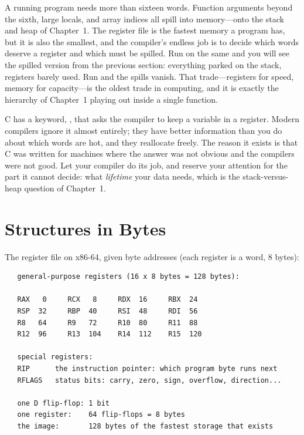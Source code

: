 A running program needs more than sixteen words. Function arguments
beyond the sixth, large locals, and array indices all spill into
memory---onto the stack and heap of Chapter~1. The register file is
the fastest memory a program has, but it is also the smallest, and
the compiler's endless job is to decide which words deserve a
register and which must be spilled. Run  on the same
 and you will see the spilled version from the previous
section: everything parked on the stack, registers barely used. Run
 and the spills vanish. That trade---registers for speed,
memory for capacity---is the oldest trade in computing, and it is
exactly the hierarchy of Chapter~1 playing out inside a single
function.

\begin{ruleofthumb}
C has a keyword, , that asks the compiler to keep a
variable in a register. Modern compilers ignore it almost entirely;
they have better information than you do about which words are hot,
and they reallocate freely. The reason it exists is that C was
written for machines where the answer was not obvious and the
compilers were not good. Let your compiler do its job, and reserve
your attention for the part it cannot decide: what \emph{lifetime}
your data needs, which is the stack-versus-heap question of
Chapter~1.
\end{ruleofthumb}

\section{Structures in Bytes}
\label{sec:structures}

The register file on x86-64, given byte addresses (each register is a
word, 8 bytes):

\begin{verbatim}
   general-purpose registers (16 x 8 bytes = 128 bytes):

   RAX   0     RCX   8     RDX  16     RBX  24
   RSP  32     RBP  40     RSI  48     RDI  56
   R8   64     R9   72     R10  80     R11  88
   R12  96     R13  104    R14  112    R15  120

   special registers:
   RIP      the instruction pointer: which program byte runs next
   RFLAGS   status bits: carry, zero, sign, overflow, direction...

   one D flip-flop: 1 bit
   one register:    64 flip-flops = 8 bytes
   the image:       128 bytes of the fastest storage that exists
\end{verbatim}

